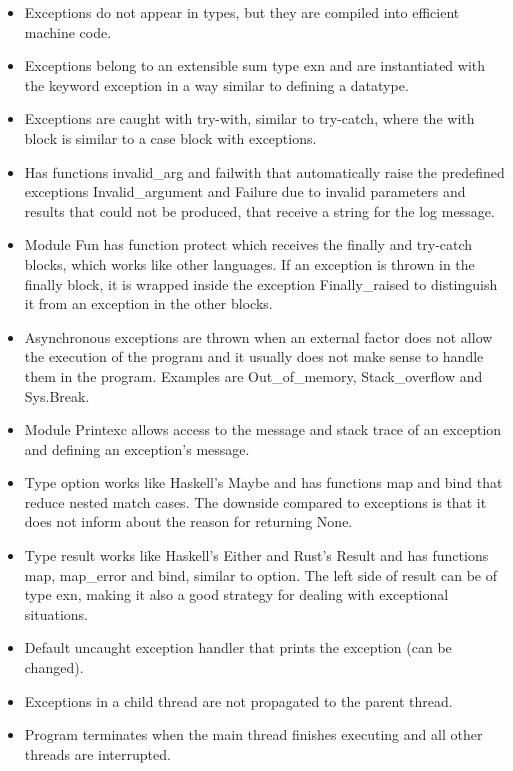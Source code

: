 \documentclass[a4paper,11pt]{article}
\theoremstyle{plain}
\theoremstyle{nonumberplain}
\begin{document}
\begin{itemize}
  \item Exceptions do not appear in types, but they are compiled into efficient machine code.
  \item Exceptions belong to an extensible sum type exn and are instantiated with the keyword exception in a way similar to defining a datatype.
  \item Exceptions are caught with try-with, similar to try-catch, where the with block is similar to a case block with exceptions.
  \item Has functions invalid\_arg and failwith that automatically raise the predefined exceptions Invalid\_argument and Failure due to invalid parameters and results that could not be produced, that receive a string for the log message.
  \item Module Fun has function protect which receives the finally and try-catch blocks, which works like other languages. If an exception is thrown in the finally block, it is wrapped inside the exception Finally\_raised to distinguish it from an exception in the other blocks.
  \item Asynchronous exceptions are thrown when an external factor does not allow the execution of the program and it usually does not make sense to handle them in the program. Examples are Out\_of\_memory, Stack\_overflow and Sys.Break.
  \item Module Printexc allows access to the message and stack trace of an exception and defining an exception's message.
  \item Type option works like Haskell's Maybe and has functions map and bind that reduce nested match cases. The downside compared to exceptions is that it does not inform about the reason for returning None.
  \item Type result works like Haskell's Either and Rust's Result and has functions map, map\_error and bind, similar to option. The left side of result can be of type exn, making it also a good strategy for dealing with exceptional situations.
  \item Default uncaught exception handler that prints the exception (can be changed).
  \item Exceptions in a child thread are not propagated to the parent thread.
  \item Program terminates when the main thread finishes executing and all other threads are interrupted.
\end{itemize}
\end{document}

